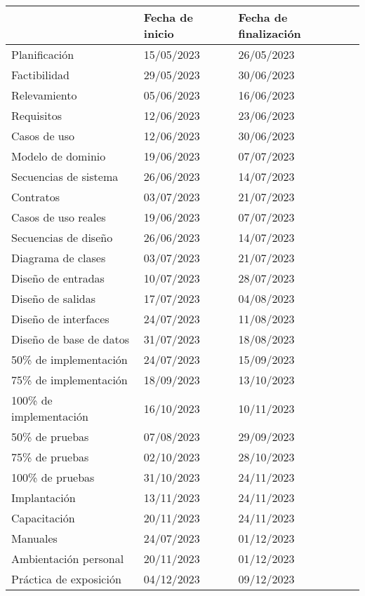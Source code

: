 \begin{center}
\begin{longtable}{
	| p{5.3cm} | p{5.3cm} | p{5.3cm} |
}
	\hline
	\rowcolor{lightgray}
	\multicolumn{1}{|p{5.3cm}|}{
		\centering
		\textbf{Actividad}
	} &
	\multicolumn{1}{p{5.3cm}|}{
		\centering
		\textbf{Fecha de inicio}
	} &
	\multicolumn{1}{p{5.3cm}|}{
		\centering
		\textbf{Fecha de finalizaci\'on}
	} \\
	\hline
	\endhead
 	Planificaci\'on &
 	15/05/2023 & 26/05/2023 \\
	\hline
 	Factibilidad &
 	29/05/2023 & 30/06/2023 \\
	\hline
 	Relevamiento &
 	05/06/2023 & 16/06/2023 \\
	\hline
 	Requisitos &
 	12/06/2023 & 23/06/2023 \\
	\hline
 	Casos de uso &
 	12/06/2023 & 30/06/2023 \\
	\hline
 	Modelo de dominio &
 	19/06/2023 & 07/07/2023 \\
	\hline
 	Secuencias de sistema &
 	26/06/2023 & 14/07/2023 \\
	\hline
 	Contratos &
 	03/07/2023 & 21/07/2023 \\
	\hline
 	Casos de uso reales &
 	19/06/2023 & 07/07/2023 \\
	\hline
 	Secuencias de dise\~no &
 	26/06/2023 & 14/07/2023 \\
	\hline
 	Diagrama de clases &
 	03/07/2023 & 21/07/2023 \\
	\hline
 	Dise\~no de entradas &
 	10/07/2023 & 28/07/2023 \\
	\hline
 	Dise\~no de salidas &
 	17/07/2023 & 04/08/2023 \\
	\hline
 	Dise\~no de interfaces &
 	24/07/2023 & 11/08/2023 \\
	\hline
 	Dise\~no de base de datos &
 	31/07/2023 & 18/08/2023 \\
	\hline
 	50\% de implementaci\'on &
 	24/07/2023 & 15/09/2023 \\
	\hline
 	75\% de implementaci\'on &
 	18/09/2023 & 13/10/2023 \\
	\hline
 	100\% de implementaci\'on &
 	16/10/2023 & 10/11/2023 \\
	\hline
 	50\% de pruebas &
 	07/08/2023 & 29/09/2023 \\
	\hline
 	75\% de pruebas &
 	02/10/2023 & 28/10/2023 \\
	\hline
 	100\% de pruebas &
 	31/10/2023 & 24/11/2023 \\
	\hline
 	Implantaci\'on &
 	13/11/2023 & 24/11/2023 \\
	\hline
 	Capacitaci\'on &
 	20/11/2023 & 24/11/2023 \\
	\hline
 	Manuales &
 	24/07/2023 & 01/12/2023 \\
	\hline
 	Ambientaci\'on personal &
 	20/11/2023 & 01/12/2023 \\
	\hline
 	Pr\'actica de exposici\'on &
 	04/12/2023 & 09/12/2023 \\
	\hline
\end{longtable}
\end{center}
